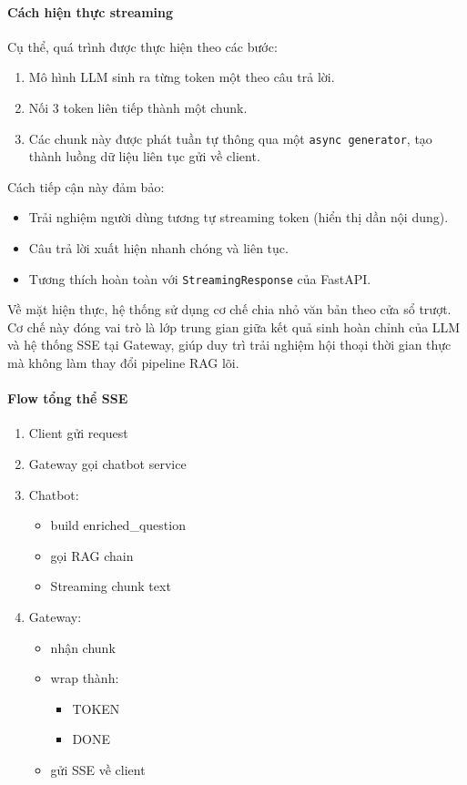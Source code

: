 \paragraph{Cách hiện thực streaming}

Cụ thể, quá trình được thực hiện theo các bước:

\begin{enumerate}
    \item Mô hình LLM sinh ra từng token một theo câu trả lời.
    \item Nối 3 token liên tiếp thành một chunk.
    \item Các chunk này được phát tuần tự thông qua một \texttt{async generator}, tạo thành luồng dữ liệu liên tục gửi về client.
\end{enumerate}

Cách tiếp cận này đảm bảo:

\begin{itemize}
    \item Trải nghiệm người dùng tương tự streaming token (hiển thị dần nội dung).
    \item Câu trả lời xuất hiện nhanh chóng và liên tục.
    \item Tương thích hoàn toàn với \texttt{StreamingResponse} của FastAPI.
\end{itemize}

Về mặt hiện thực, hệ thống sử dụng cơ chế chia nhỏ văn bản theo cửa sổ trượt. Cơ chế này đóng vai trò là lớp trung gian giữa kết quả sinh hoàn chỉnh của LLM và hệ thống SSE tại Gateway, giúp duy trì trải nghiệm hội thoại thời gian thực mà không làm thay đổi pipeline RAG lõi.


\paragraph{Flow tổng thể SSE}

\begin{enumerate}
    \item Client gửi request
    \item Gateway gọi chatbot service
    \item Chatbot:
    \begin{itemize}
        \item build enriched\_question
        \item gọi RAG chain
        \item Streaming chunk text
    \end{itemize}
    \item Gateway:
    \begin{itemize}
        \item nhận chunk
        \item wrap thành:
        \begin{itemize}
            \item TOKEN
            \item DONE
        \end{itemize}
        \item gửi SSE về client
    \end{itemize}
\end{enumerate}


